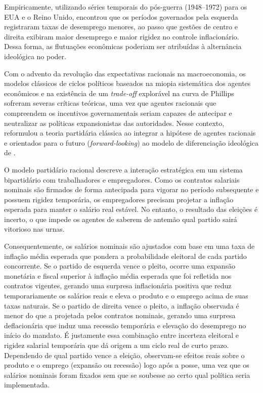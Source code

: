 Empiricamente, utilizando séries temporais do pós-guerra (1948--1972) para os EUA e o Reino Unido, \textcite{hibbs1977} encontrou que os períodos governados pela esquerda registraram taxas de desemprego menores, ao passo que gestões de centro e direita exibiram maior desemprego e maior rigidez no controle inflacionário. Dessa forma, as flutuações econômicas poderiam ser atribuídas à alternância ideológica no poder.

Com o advento da revolução das expectativas racionais na macroeconomia, os modelos clássicos de ciclos políticos baseados na miopia sistemática dos agentes econômicos e na existência de um \textit{trade-off} explorável na curva de Phillips sofreram severas críticas teóricas, uma vez que agentes racionais que compreendem os incentivos governamentais seriam capazes de antecipar e neutralizar as políticas expansionistas das autoridades. Nesse contexto, \textcite{alesina1987} reformulou a teoria partidária clássica ao integrar a hipótese de agentes racionais e orientados para o futuro (\textit{forward-looking}) ao modelo de diferenciação ideológica de \textcite{hibbs1977}.

O modelo partidário racional descreve a interação estratégica em um sistema bipartidário com trabalhadores e empregadores. Como os contratos salariais nominais são firmados de forma antecipada para vigorar no período subsequente e possuem rigidez temporária, os empregadores precisam projetar a inflação esperada para manter o salário real estável. No entanto, o resultado das eleições é incerto, o que impede os agentes de saberem de antemão qual partido sairá vitorioso nas urnas.

Consequentemente, os salários nominais são ajustados com base em uma taxa de inflação média esperada que pondera a probabilidade eleitoral de cada partido concorrente. Se o partido de esquerda vence o pleito, ocorre uma expansão monetária e fiscal superior à inflação média esperada que foi refletida nos contratos vigentes, gerando uma surpresa inflacionária positiva que reduz temporariamente os salários reais e eleva o produto e o emprego acima de suas taxas naturais. Se o partido de direita vence o pleito, a inflação observada é menor do que a projetada pelos contratos nominais, gerando uma surpresa deflacionária que induz uma recessão temporária e elevação do desemprego no início do mandato. É justamente essa combinação entre incerteza eleitoral e rigidez salarial temporária que dá origem a um ciclo real de curto prazo. Dependendo de qual partido vence a eleição, observam-se efeitos reais sobre o produto e o emprego (expansão ou recessão) logo após a posse, uma vez que os salários nominais foram fixados sem que se soubesse ao certo qual política seria implementada.

